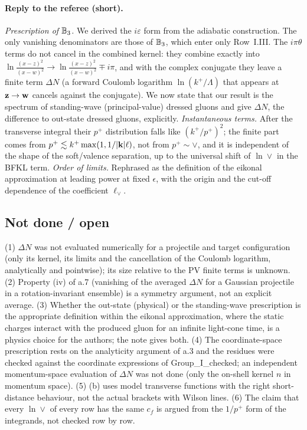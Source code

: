\paragraph{Reply to the referee (short).} \emph{Prescription of $\mathbb{B}_3$.} We derived the $i\varepsilon$ form from the adiabatic construction. The only vanishing denominators are those of $\mathbb{B}_3$, which enter only Row~I.III. The $i\pi\theta$ terms do not cancel in the combined kernel: they combine exactly into $\ln\frac{(x-z)^2}{(x-w)^2}\to\ln\frac{(x-z)^2}{(x-w)^2}\mp i\pi$, and with the complex conjugate they leave a finite term $\Delta N$ (a forward Coulomb logarithm $\ln(k^+/\Lambda)$ that appears at $\mathbf{z}\to\mathbf{w}$ cancels against the conjugate). We now state that our result is the spectrum of standing-wave (principal-value) dressed gluons and give $\Delta N$, the difference to out-state dressed gluons, explicitly. \emph{Instantaneous terms.} After the transverse integral their $p^+$ distribution falls like $(k^+/p^+)^2$; the finite part comes from $p^+\lesssim k^+\max(1,1/|\mathbf{k}|\ell)$, not from $p^+\sim\vee$, and it is independent of the shape of the soft/valence separation, up to the universal shift of $\ln\vee$ in the BFKL term. \emph{Order of limits.} Rephrased as the definition of the eikonal approximation at leading power at fixed $\epsilon$, with the origin and the cut-off dependence of the coefficient $\ell_\vee$.

\endgroup
\subsection{Not done / open}
\noindent (1) $\Delta N$ was not evaluated numerically for a projectile and target configuration (only its kernel, its limits and the cancellation of the Coulomb logarithm, analytically and pointwise); its size relative to the PV finite terms is unknown. (2) Property (iv) of a.7 (vanishing of the averaged $\Delta N$ for a Gaussian projectile in a rotation-invariant ensemble) is a symmetry argument, not an explicit average. (3) Whether the out-state (physical) or the standing-wave prescription is the appropriate definition within the eikonal approximation, where the static charges interact with the produced gluon for an infinite light-cone time, is a physics choice for the authors; the note gives both. (4) The coordinate-space prescription rests on the analyticity argument of a.3 and the residues were checked against the coordinate expressions of Group\_I\_checked; an independent momentum-space evaluation of $\Delta N$ was not done (only the on-shell kernel $n$ in momentum space). (5) (b) uses model transverse functions with the right short-distance behaviour, not the actual brackets with Wilson lines. (6) The claim that every $\ln\vee$ of every row has the same $c_f$ is argued from the $1/p^+$ form of the integrands, not checked row by row.
